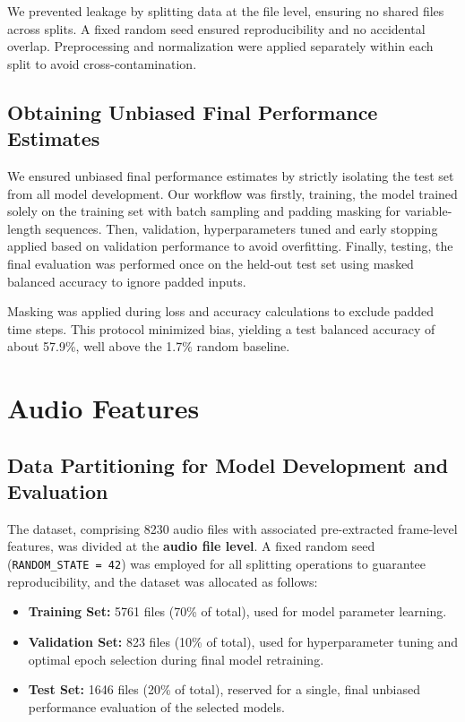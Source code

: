 \documentclass{article}
\newcommand{\code}[1]{\texttt{#1}}
\begin{document}
We prevented leakage by splitting data at the file level, ensuring no shared files across splits. A fixed random seed ensured reproducibility and no accidental overlap. Preprocessing and normalization were applied separately within each split to avoid cross-contamination.

\subsection{Obtaining Unbiased Final Performance Estimates}
We ensured unbiased final performance estimates by strictly isolating the test set from all model development. Our workflow was firstly, training, the model trained solely on the training set with batch sampling and padding masking for variable-length sequences. Then, validation, hyperparameters tuned and early stopping applied based on validation performance to avoid overfitting. Finally, testing, the final evaluation was performed once on the held-out test set using masked balanced accuracy to ignore padded inputs.

Masking was applied during loss and accuracy calculations to exclude padded time steps. This protocol minimized bias, yielding a test balanced accuracy of about 57.9\%, well above the 1.7\% random baseline.

\section{Audio Features}
\label{sec:data_split}

\subsection{Data Partitioning for Model Development and Evaluation}
The dataset, comprising 8230 audio files with associated pre-extracted frame-level features, was divided at the \textbf{audio file level}. A fixed random seed (\code{RANDOM\_STATE = 42}) was employed for all splitting operations to guarantee reproducibility, and the dataset was allocated as follows:
\begin{itemize}
    \item \textbf{Training Set:} 5761 files (70\% of total), used for model parameter learning.
    \item \textbf{Validation Set:} 823 files (10\% of total), used for hyperparameter tuning and optimal epoch selection during final model retraining.
    \item \textbf{Test Set:} 1646 files (20\% of total), reserved for a single, final unbiased performance evaluation of the selected models.
\end{itemize}
\end{document}
